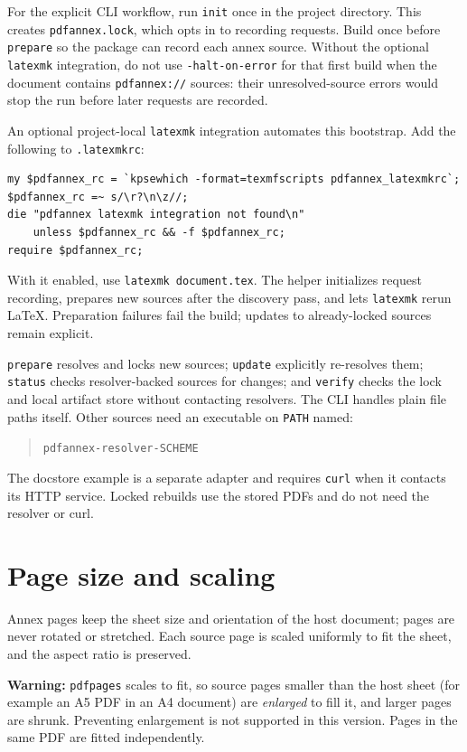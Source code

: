 \documentclass{article}
\begin{document}
For the explicit CLI workflow, run \texttt{init} once in the project
directory. This creates \texttt{pdfannex.lock}, which opts in to recording
requests. Build once before \texttt{prepare} so the package can record each
annex source. Without the optional \texttt{latexmk} integration, do not use
\texttt{-halt-on-error} for that first build when the document contains
\texttt{pdfannex://} sources: their unresolved-source errors would stop the
run before later requests are recorded.

An optional project-local \texttt{latexmk} integration automates this
bootstrap. Add the following to \texttt{.latexmkrc}:

{\small
\begin{verbatim}
my $pdfannex_rc = `kpsewhich -format=texmfscripts pdfannex_latexmkrc`;
$pdfannex_rc =~ s/\r?\n\z//;
die "pdfannex latexmk integration not found\n"
    unless $pdfannex_rc && -f $pdfannex_rc;
require $pdfannex_rc;
\end{verbatim}
}

With it enabled, use \texttt{latexmk document.tex}. The helper initializes
request recording, prepares new sources after the discovery pass, and lets
\texttt{latexmk} rerun LaTeX. Preparation failures fail the build; updates to
already-locked sources remain explicit.

\texttt{prepare} resolves and locks new sources; \texttt{update} explicitly
re-resolves them; \texttt{status} checks resolver-backed sources for changes;
and \texttt{verify} checks the lock and local artifact store without contacting
resolvers. The CLI handles plain file paths itself. Other sources need an
executable on \texttt{PATH} named:
\begin{quote}
\texttt{pdfannex-resolver-SCHEME}
\end{quote}
The docstore example is a separate adapter and requires \texttt{curl} when it
contacts its HTTP service. Locked rebuilds use the stored PDFs and do not need
the resolver or curl.

\section{Page size and scaling}

Annex pages keep the sheet size and orientation of the host document; pages are
never rotated or stretched. Each source page is scaled uniformly to fit the
sheet, and the aspect ratio is preserved.

\textbf{Warning:} \texttt{pdfpages} scales to fit, so source pages smaller than
the host sheet (for example an A5 PDF in an A4 document) are \emph{enlarged}
to fill it, and larger pages are shrunk. Preventing enlargement is not
supported in this version. Pages in the same PDF are fitted independently.
\end{document}
